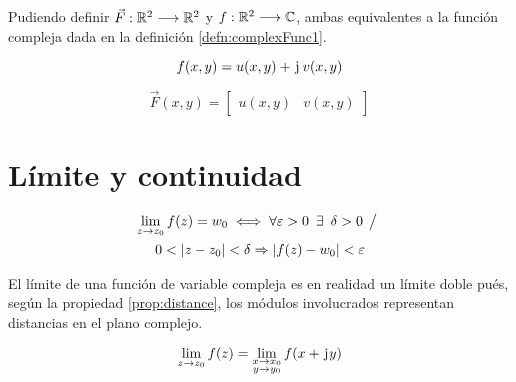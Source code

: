Pudiendo definir $\Vec{F}: \mathbb{R}^2 \longrightarrow \mathbb{R}^2$ y $f: \mathbb{R}^2 \longrightarrow \mathbb{C}$, ambas equivalentes a la función compleja dada en la definición \ref{defn:complexFunc1}.

\begin{mdframed}[style=DefinitionFrame]
    \begin{defn}
    \end{defn}
    \begin{equation*}
        f(x,y) = u(x,y) + \mkern2mu\mathrm{j}\mkern1mu \, v(x,y)
    \end{equation*}
\end{mdframed}

\begin{mdframed}[style=DefinitionFrame]
    \begin{defn}
    \end{defn}
    \begin{equation*}
        \Vec{F}(x,y) = \begin{bmatrix} u(x,y) & v(x,y) \end{bmatrix}
    \end{equation*}
\end{mdframed}


\section{Límite y continuidad}

\begin{mdframed}[style=DefinitionFrame]
    \begin{defn}
    \end{defn}
    \begin{multline*}
        \lim_{z \to z_0} f(z) = w_0 \iff \forall \varepsilon > 0 \enspace \exists \enspace \delta > 0 \hspace{1ex} \big/ \hspace{1ex}
        \\
        0 < {\left| {z-z_0} \right|} < \delta \Rightarrow {\left| {f(z)-w_0} \right|} < \varepsilon
    \end{multline*}
\end{mdframed}

El límite de una función de variable compleja es en realidad un límite doble pués, según la propiedad \ref{prop:distance}, los módulos involucrados representan distancias en el plano complejo.

\begin{mdframed}[style=PropertyFrame]
    \begin{prop}
        \label{prop:limit}
    \end{prop}
    \begin{equation*}
        \lim_{z \to z_0} f(z) = \lim_{\substack{x \to x_0\\y \to y_0}} f(x + \mkern2mu\mathrm{j}\mkern1mu y)
    \end{equation*}
\end{mdframed}

